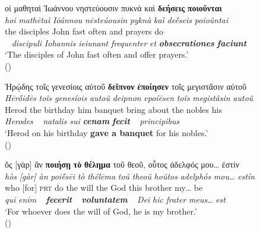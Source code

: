 \documentclass[output=paper,colorlinks,citecolor=brown]{langscibook}
\begin{document}
\ea\label{ex:bj:4}

\ea\label{ex:bj:4a}

\gllll οἱ μαθηταὶ Ἰωάννου νηστεύουσιν πυκνὰ καὶ \textbf{δεήσεις} \textbf{ποιοῦνται}\\
 \textit{hoi} \textit{mathētaì} \textit{Iōánnou} \textit{nēsteúousin} \textit{pyknà} \textit{kaì} \textit{deḗseis} \textit{poioûntai}\\
the disciples John fast often and prayers do\\
~ \emph{discipuli} \emph{Iohannis} \emph{ieiunant} \emph{frequenter} \emph{et}
\textbf{\itshape obsecrationes} \textbf{\itshape faciunt}\\
\glt `The disciples of John fast often and offer prayers.' \\
\hspace*{\fill}()

\ex\label{ex:bj:4b}

\gllll Ἡρῴδης τοῖς γενεσίοις αὐτοῦ \textbf{δεῖπνον} \textbf{ἐποίησεν} τοῖς μεγιστᾶσιν αὐτοῦ\\
 \textit{Hērṓidēs} \textit{toîs} \textit{genesíois} \textit{autoû} \textit{deipnon} \textit{epoíēsen} \textit{toîs} \textit{megistâsin} \textit{autoû}\\
Herod the birthday him banquet {bring about} the nobles his\\
\emph{Herodes} ~ \emph{natalis} \emph{sui} \textbf{\itshape cenam} \textbf{\itshape fecit}
~ \textit{principibus}\\
\glt `Herod on his birthday \textbf{gave a banquet} for his nobles.' \\
\hspace*{\fill}()

\ex\label{ex:bj:4c}

\gllll ὃς {[}γὰρ{]} ἂν \textbf{ποιήσῃ} \textbf{τὸ} \textbf{θέλημα} τοῦ θεοῦ, οὗτος ἀδελφός μου\ldots{} ἐστίν\\
 \textit{hòs} \textit{{[}gàr{]}} \textit{àn} \textit{poiḗsēi} \textit{tò} \textit{thélēma} \textit{toû} \textit{theoû} \textit{hoûtos} \textit{adelphós} \textit{mou\ldots{}} \textit{estín}\\
who {[}for{]} \textsc{prt} do the will the God this brother my\ldots{} be\\
\emph{qui} \emph{enim} ~ \textbf{\itshape fecerit} ~ \textbf{\itshape voluntatem} ~ \emph{Dei} \emph{hic} \emph{frater} \emph{meus}\ldots{} \emph{est}\\
\glt `For whoever does the will of God, he is my brother.' \\
\hspace*{\fill}()
\end{document}
